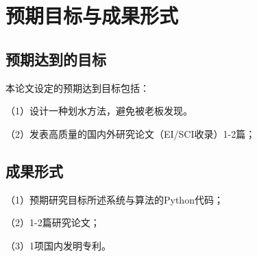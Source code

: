 \chapter{预期目标与成果形式}

\section{预期达到的目标}

本论文设定的预期达到目标包括：


\noindent（1）设计一种划水方法，避免被老板发现。

\noindent（2）发表高质量的国内外研究论文（EI/SCI收录）1-2篇；


\section{成果形式}

\noindent（1）预期研究目标所述系统与算法的Python代码；

\noindent（2）1-2篇研究论文；

\noindent（3）1项国内发明专利。
